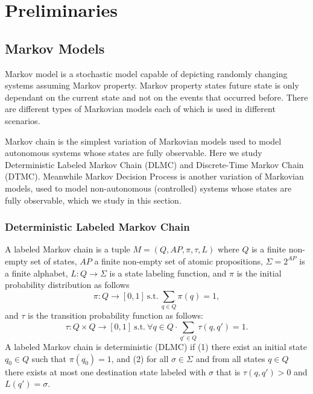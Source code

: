 \documentclass[
a4paper,
12pt
]{scrartcl}
\begin{document}
\newpage
\section{Preliminaries}
\subsection{Markov Models}
Markov model is a stochastic model capable of depicting randomly changing systems assuming Markov property. Markov property states future state is only dependant on the current state and not on the events that occurred before. There are different types of Markovian models each of which is used in different scenarios.
\par Markov chain is the simplest variation of Markovian models used to model autonomous systems whose states are fully observable. Here we study Deterministic Labeled Markov Chain (DLMC) and Discrete-Time Markov Chain (DTMC). Meanwhile Markov Decision Process is another variation of Markovian models, used to model non-autonomous (controlled) systems whose states are fully observable, which we study in this section.
\subsubsection{Deterministic Labeled Markov Chain}
A labeled Markov chain is a tuple $M=(Q,AP,\pi,\tau,L)$ where $Q$ is a finite non-empty set of states, $AP$ a finite non-empty set of atomic propositions, $\Sigma=2^{AP}$ is a finite alphabet, $L:Q\to \Sigma$ is a state labeling function, and $\pi$ is the initial probability distribution as follows
\begin{equation*}
  \pi:Q\to [0,1]~\text{s.t.}~\sum_{q\in Q} \pi(q)=1,
\end{equation*}
and $\tau$ is the transition probability function as follows:
\begin{equation*}
  \tau: Q\times Q \to [0,1]~\text{s.t.}~\forall q \in Q \cdot \sum_{q'\in Q}\tau(q,q')=1.
\end{equation*}
A labeled Markov chain is deterministic (DLMC) if (1) there exist an initial state $q_0\in Q$ such that $\pi(q_0)=1$, and (2) for all $\sigma \in \Sigma$ and from all states $q \in Q$ there exists at most one destination state labeled with $\sigma$ that is $\tau(q,q')>0$ and $L(q')=\sigma$.
\end{document}
